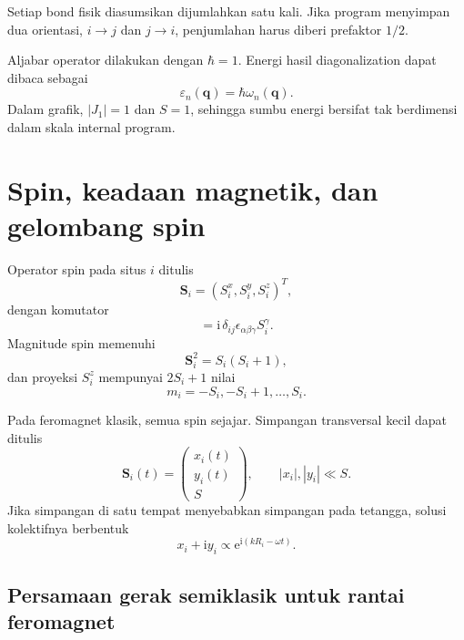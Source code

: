 \documentclass[11pt,a4paper]{article}
\newcommand{\ii}{\mathrm{i}}
\newcommand{\ee}{\mathrm{e}}
\newcommand{\vq}{\bm q}
\newcommand{\vS}{\bm S}
\begin{document}
Setiap bond fisik diasumsikan dijumlahkan satu kali. Jika program menyimpan dua orientasi, $i\to j$ dan $j\to i$, penjumlahan harus diberi prefaktor $1/2$.

Aljabar operator dilakukan dengan $\hbar=1$. Energi hasil diagonalization dapat dibaca sebagai
\begin{equation}
\varepsilon_n(\vq)=\hbar\omega_n(\vq).
\end{equation}
Dalam grafik, $|J_1|=1$ dan $S=1$, sehingga sumbu energi bersifat tak berdimensi dalam skala internal program.

\section{Spin, keadaan magnetik, dan gelombang spin}

Operator spin pada situs $i$ ditulis
\begin{equation}
\vS_i=(S_i^x,S_i^y,S_i^z)^T,
\end{equation}
dengan komutator
\begin{equation}
[S_i^\alpha,S_j^\beta]
=\ii\,\delta_{ij}\epsilon_{\alpha\beta\gamma}S_i^\gamma.
\end{equation}
Magnitude spin memenuhi
\begin{equation}
\vS_i^2=S_i(S_i+1),
\end{equation}
dan proyeksi $S_i^z$ mempunyai $2S_i+1$ nilai
\begin{equation}
m_i=-S_i,-S_i+1,\ldots,S_i.
\end{equation}

Pada feromagnet klasik, semua spin sejajar. Simpangan transversal kecil dapat ditulis
\begin{equation}
\vS_i(t)=
\begin{pmatrix}
x_i(t)\\y_i(t)\\S
\end{pmatrix},
\qquad |x_i|,|y_i|\ll S.
\end{equation}
Jika simpangan di satu tempat menyebabkan simpangan pada tetangga, solusi kolektifnya berbentuk
\begin{equation}
x_i+\ii y_i\propto
\ee^{\ii(kR_i-\omega t)}.
\end{equation}

\subsection{Persamaan gerak semiklasik untuk rantai feromagnet}
\end{document}
